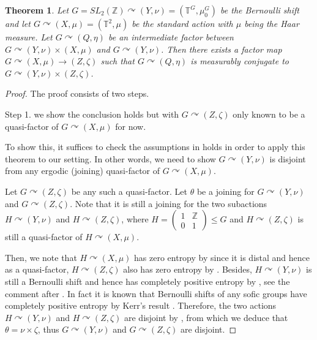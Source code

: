 \documentclass[12pt]{amsart}
\newtheorem{thm}{Theorem}[section]
\theoremstyle{definition}
\begin{document}
\begin{thm}
\label{thm:toricaction}
Let $G=SL_2(\mathbb{Z})\curvearrowright (Y,\nu)=(\mathbb{T}^{G},\mu_0^G)$ be the Bernoulli shift and let $G\curvearrowright (X,\mu)=(\mathbb{T}^2, \mu)$ be the standard action with $\mu$ being the Haar measure. Let $G\curvearrowright (Q,\eta)$ be an intermediate factor between $G\curvearrowright (Y,\nu)\times (X,\mu)$ and $G\curvearrowright (Y,\nu)$. Then there exists a factor map $G\curvearrowright (X,\mu)\rightarrow (Z,\zeta)$ such that $G\curvearrowright (Q,\eta)$ is measurably conjugate to $G\curvearrowright (Y,\nu)\times (Z,\zeta)$. 
\end{thm}
\begin{proof}
The proof consists of two steps.

Step 1. we show the conclusion holds but with $G\curvearrowright (Z,\zeta)$ only known to be a quasi-factor of $G\curvearrowright (X,\mu)$ for now.


To show this, it suffices to check the assumptions in \cite[Theorem 1.1]{glasner2023intermediate} holds in order to apply this theorem to our setting. In other words, we need to show $G\curvearrowright(Y,\nu)$ is disjoint from any ergodic (joining) quasi-factor of $G\curvearrowright (X,\mu)$.

Let $G\curvearrowright (Z,\zeta)$ be any such a quasi-factor. Let $\theta$ be a joining for $G\curvearrowright (Y,\nu)$ and $G\curvearrowright (Z,\zeta)$. Note that it is still a joining for the two subactions $H\curvearrowright (Y,\nu)$ and $H\curvearrowright (Z,\zeta)$, where $H=\begin{pmatrix}
1&\mathbb{Z}\\
0&1
\end{pmatrix}\leq G$ and $H\curvearrowright (Z,\zeta)$ is still a quasi-factor of $H\curvearrowright (X,\mu)$.

Then, we note that $H\curvearrowright (X,\mu)$ has zero entropy by \cite[Theorem 18.19]{Glasner-book} since it is distal and hence as a quasi-factor, $H\curvearrowright (Z,\zeta)$ also has zero entropy by \cite[Theorem 18.17]{Glasner-book}. Besides, $H\curvearrowright (Y,\nu)$ is still a Bernoulli shift and hence has completely positive entropy by \cite[Proposition 3.51 and Lemma 18.7(3)]{Glasner-book}, see the comment after \cite[Definition 18.8]{Glasner-book}. In fact it is known that Bernoulli shifts of any sofic groups have completely positive entropy by Kerr's result \cite{kerr}. Therefore, the two actions $H\curvearrowright (Y,\nu)$ and $H\curvearrowright (Z,\zeta)$ are disjoint by \cite{furstenberg}, from which we deduce that $\theta=\nu\times \zeta$, thus $G\curvearrowright (Y,\nu)$ and $G\curvearrowright (Z,\zeta)$ are disjoint.


\end{proof}
\end{document}
